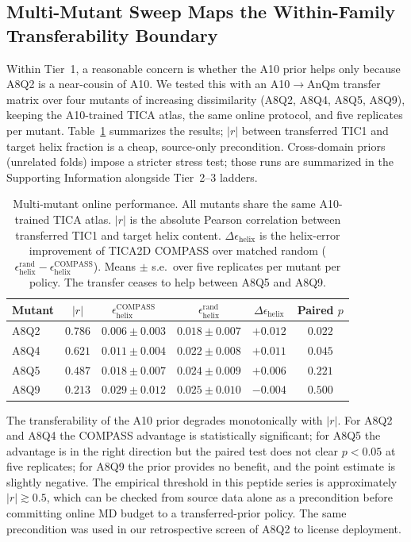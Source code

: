 \documentclass[journal=jctcce,manuscript=article,layout=twocolumn]{achemso}
\begin{document}
\subsection{Multi-Mutant Sweep Maps the Within-Family Transferability Boundary}
\label{sec:results_multimutant}

Within Tier~1, a reasonable concern is whether the A10 prior helps only because A8Q2 is a near-cousin of A10. We tested this with an A10$\to$AnQm transfer matrix over four mutants of increasing dissimilarity (A8Q2, A8Q4, A8Q5, A8Q9), keeping the A10-trained TICA atlas, the same online protocol, and five replicates per mutant. Table~\ref{tab:multimutant} summarizes the results; $|r|$ between transferred TIC1 and target helix fraction is a cheap, source-only precondition. Cross-domain priors (unrelated folds) impose a stricter stress test; those runs are summarized in the Supporting Information alongside Tier~2--3 ladders.

\begin{table}[htbp]
    \centering
    \caption{Multi-mutant online performance. All mutants share the same A10-trained TICA atlas. $|r|$ is the absolute Pearson correlation between transferred TIC1 and target helix content. $\Delta\epsilon_{\mathrm{helix}}$ is the helix-error improvement of TICA2D COMPASS over matched random ($\epsilon^{\mathrm{rand}}_{\mathrm{helix}} - \epsilon^{\mathrm{COMPASS}}_{\mathrm{helix}}$). Means $\pm$ s.e.\ over five replicates per mutant per policy. The transfer ceases to help between A8Q5 and A8Q9.}
    \label{tab:multimutant}
    \begin{tabular}{lccccc}
        \toprule
        Mutant & $|r|$ & $\epsilon^{\mathrm{COMPASS}}_{\mathrm{helix}}$ & $\epsilon^{\mathrm{rand}}_{\mathrm{helix}}$ & $\Delta\epsilon_{\mathrm{helix}}$ & Paired $p$ \\
        \midrule
        A8Q2 & $0.786$ & $0.006\pm 0.003$ & $0.018\pm 0.007$ & $+0.012$ & $0.022$ \\
        A8Q4 & $0.621$ & $0.011\pm 0.004$ & $0.022\pm 0.008$ & $+0.011$ & $0.045$ \\
        A8Q5 & $0.487$ & $0.018\pm 0.007$ & $0.024\pm 0.009$ & $+0.006$ & $0.221$ \\
        A8Q9 & $0.213$ & $0.029\pm 0.012$ & $0.025\pm 0.010$ & $-0.004$ & $0.500$ \\
        \bottomrule
    \end{tabular}
\end{table}

The transferability of the A10 prior degrades monotonically with $|r|$. For A8Q2 and A8Q4 the COMPASS advantage is statistically significant; for A8Q5 the advantage is in the right direction but the paired test does not clear $p<0.05$ at five replicates; for A8Q9 the prior provides no benefit, and the point estimate is slightly negative. The empirical threshold in this peptide series is approximately $|r|\gtrsim 0.5$, which can be checked from source data alone as a precondition before committing online MD budget to a transferred-prior policy. The same precondition was used in our retrospective screen of A8Q2 to license deployment.
\end{document}
